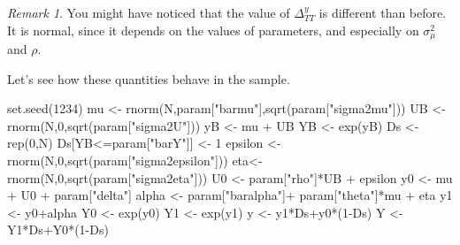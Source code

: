 \documentclass[
]{book}
\newenvironment{Shaded}{\begin{snugshade}}{\end{snugshade}}
\newcommand{\DecValTok}[1]{\textcolor[rgb]{0.00,0.00,0.81}{#1}}
\newcommand{\FunctionTok}[1]{\textcolor[rgb]{0.00,0.00,0.00}{#1}}
\newcommand{\NormalTok}[1]{#1}
\newcommand{\OtherTok}[1]{\textcolor[rgb]{0.56,0.35,0.01}{#1}}
\newcommand{\SpecialCharTok}[1]{\textcolor[rgb]{0.00,0.00,0.00}{#1}}
\newcommand{\StringTok}[1]{\textcolor[rgb]{0.31,0.60,0.02}{#1}}
\theoremstyle{definition}
\theoremstyle{definition}
\theoremstyle{definition}
\theoremstyle{definition}
\theoremstyle{remark}
\newtheorem*{remark}{Remark}
\begin{document}
\begin{remark}
\iffalse{} {Remark. } \fi{}You might have noticed that the value of \(\Delta^y_{TT}\) is different than before.
It is normal, since it depends on the values of parameters, and especially on \(\sigma_{\mu}^2\) and \(\rho\).
\end{remark}

Let's see how these quantities behave in the sample.

\begin{Shaded}
\begin{Highlighting}[]
\FunctionTok{set.seed}\NormalTok{(}\DecValTok{1234}\NormalTok{)}
\NormalTok{mu }\OtherTok{\textless{}{-}} \FunctionTok{rnorm}\NormalTok{(N,param[}\StringTok{"barmu"}\NormalTok{],}\FunctionTok{sqrt}\NormalTok{(param[}\StringTok{"sigma2mu"}\NormalTok{]))}
\NormalTok{UB }\OtherTok{\textless{}{-}} \FunctionTok{rnorm}\NormalTok{(N,}\DecValTok{0}\NormalTok{,}\FunctionTok{sqrt}\NormalTok{(param[}\StringTok{"sigma2U"}\NormalTok{]))}
\NormalTok{yB }\OtherTok{\textless{}{-}}\NormalTok{ mu }\SpecialCharTok{+}\NormalTok{ UB }
\NormalTok{YB }\OtherTok{\textless{}{-}} \FunctionTok{exp}\NormalTok{(yB)}
\NormalTok{Ds }\OtherTok{\textless{}{-}} \FunctionTok{rep}\NormalTok{(}\DecValTok{0}\NormalTok{,N)}
\NormalTok{Ds[YB}\SpecialCharTok{\textless{}=}\NormalTok{param[}\StringTok{"barY"}\NormalTok{]] }\OtherTok{\textless{}{-}} \DecValTok{1} 
\NormalTok{epsilon }\OtherTok{\textless{}{-}} \FunctionTok{rnorm}\NormalTok{(N,}\DecValTok{0}\NormalTok{,}\FunctionTok{sqrt}\NormalTok{(param[}\StringTok{"sigma2epsilon"}\NormalTok{]))}
\NormalTok{eta}\OtherTok{\textless{}{-}} \FunctionTok{rnorm}\NormalTok{(N,}\DecValTok{0}\NormalTok{,}\FunctionTok{sqrt}\NormalTok{(param[}\StringTok{"sigma2eta"}\NormalTok{]))}
\NormalTok{U0 }\OtherTok{\textless{}{-}}\NormalTok{ param[}\StringTok{"rho"}\NormalTok{]}\SpecialCharTok{*}\NormalTok{UB }\SpecialCharTok{+}\NormalTok{ epsilon}
\NormalTok{y0 }\OtherTok{\textless{}{-}}\NormalTok{ mu }\SpecialCharTok{+}\NormalTok{  U0 }\SpecialCharTok{+}\NormalTok{ param[}\StringTok{"delta"}\NormalTok{]}
\NormalTok{alpha }\OtherTok{\textless{}{-}}\NormalTok{ param[}\StringTok{"baralpha"}\NormalTok{]}\SpecialCharTok{+}\NormalTok{  param[}\StringTok{"theta"}\NormalTok{]}\SpecialCharTok{*}\NormalTok{mu }\SpecialCharTok{+}\NormalTok{ eta}
\NormalTok{y1 }\OtherTok{\textless{}{-}}\NormalTok{ y0}\SpecialCharTok{+}\NormalTok{alpha}
\NormalTok{Y0 }\OtherTok{\textless{}{-}} \FunctionTok{exp}\NormalTok{(y0)}
\NormalTok{Y1 }\OtherTok{\textless{}{-}} \FunctionTok{exp}\NormalTok{(y1)}
\NormalTok{y }\OtherTok{\textless{}{-}}\NormalTok{ y1}\SpecialCharTok{*}\NormalTok{Ds}\SpecialCharTok{+}\NormalTok{y0}\SpecialCharTok{*}\NormalTok{(}\DecValTok{1}\SpecialCharTok{{-}}\NormalTok{Ds)}
\NormalTok{Y }\OtherTok{\textless{}{-}}\NormalTok{ Y1}\SpecialCharTok{*}\NormalTok{Ds}\SpecialCharTok{+}\NormalTok{Y0}\SpecialCharTok{*}\NormalTok{(}\DecValTok{1}\SpecialCharTok{{-}}\NormalTok{Ds)}
\end{Highlighting}
\end{Shaded}
\end{document}
